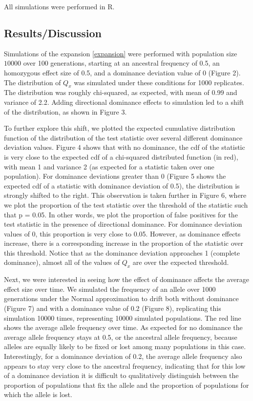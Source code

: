 \documentclass[a4paper,12pt]{article}
\begin{document}
All simulations were performed in R. 

\subsection*{Results/Discussion}
Simulations of the expansion \eqref{expansion} were performed with
population size $10000$ over 100 generations, starting at an ancestral
frequency of 0.5, an homozygous effect size of 0.5, and a dominance
deviation value of 0 (Figure 2). The distribution of $Q_x$ was simulated under
these conditions for 1000 replicates. The distribution was roughly
chi-squared, as expected, with mean of 0.99 and variance of
2.2. Adding directional dominance effects to simulation led to a shift of the
distribution, as shown in Figure 3.

To further explore this shift, we plotted the expected cumulative
distribution function of the distribution of the test statistic over
several different dominance deviation values. Figure 4 shows that with
no dominance, the cdf of the statistic is very close to the expected
cdf of a chi-squared distributed function (in red), with mean 1 and variance 2
(as expected for a statistic taken over one population). For dominance
deviations greater than 0 (Figure 5 shows the expected cdf of a
statistic with dominance deviation of 0.5), the distribution is
strongly shifted to the right. This observation is taken further in
Figure 6, where we plot the proportion of the test statistic over the
threshold of the statistic such that p = 0.05. In other words, we plot the
proportion of false positives for the test statistic in the presence
of directional dominance. For dominance deviation
values of 0, this proportion is very close to 0.05. However, as
dominance effects increase, there is a corresponding increase in the
proportion of the statistic over this threshold. Notice that as the
dominance deviation approaches 1 (complete dominance), almost all of
the values of $Q_x$ are over the expected threshold.

Next, we were interested in seeing how the effect of dominance affects
the average effect size over time. We simulated the frequency of an
allele over 1000 generations under the Normal approximation to drift
both without dominance (Figure 7) and with a dominance value of 0.2
(Figure 8), replicating this simulation 10000 times, representing 10000
simulated populations. The red line shows the average allele frequency
over time. As expected for no dominance the average allele frequency
stays at 0.5, or the ancestral allele frequency, because alleles
are equally likely to be fixed or lost among many populations in this
case. Interestingly, for a dominance deviation of 0.2, the average allele
frequency also appears to stay very close to the ancestral frequency,
indicating that for this low of a dominance deviation it is difficult
to qualitatively distinguish between the proportion of populations
that fix the allele and the proportion of populations for which the
allele is lost.
\end{document}
